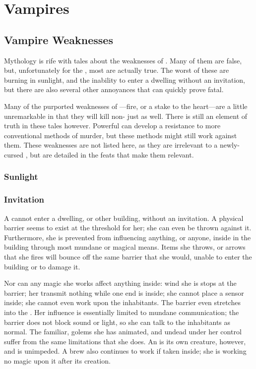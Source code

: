 \chapter{Vampires}

\section{Vampire Weaknesses}

Mythology is rife with tales about the weaknesses of {\vampires}.
Many of them are false, but, unfortunately for the {\vampires}, most are actually true.
The worst of these are burning in sunlight, and the inability to enter a dwelling without an invitation, but there are also several other annoyances that can quickly prove fatal.

Many of the purported weaknesses of {\vampires}---fire, or a stake to the heart---are a little unremarkable in that they will kill non-{\vampires} just as well.
There is still an element of truth in these tales however.
Powerful {\vampires} can develop a resistance to more conventional methods of murder, but these methods might still work against them.
These weaknesses are not listed here, as they are irrelevant to a newly-cursed {\vampire}, but are detailed in the feats that make them relevant.

\subsection{Sunlight}



\subsection{Invitation}

A {\vampire} cannot enter a dwelling, or other building, without an invitation.
A physical barrier seems to exist at the threshold for her; she can even be thrown against it.
Furthermore, she is prevented from influencing anything, or anyone, inside in the building through most mundane or magical means.
Items she throws, or arrows that she fires will bounce off the same barrier that she would, unable to enter the building or to damage it.

Nor can any magic she works affect anything inside: wind she is  stops at the barrier; her {\symlinks} transmit nothing while one end is inside; she cannot place a  sensor inside; she cannot even work  upon the inhabitants.
The barrier even stretches into the {\mentalrealm}.
Her influence is essentially limited to mundane communication; the barrier does not block sound or light, so she can talk to the inhabitants as normal.
The {\vampirepossessive} familiar, golems she has animated, and undead under her control suffer from the same limitations that she does.
An  is its own creature, however, and is unimpeded.
A {\vampirepossessive} brew also continues to work if taken inside; she is working no magic upon it after its creation.

